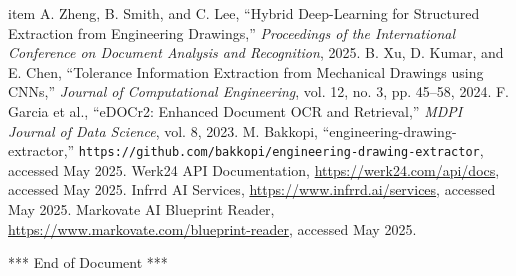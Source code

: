\documentclass[11pt,a4paper]{article}
\begin{document}
\begin{thebibliography}{9}
  \bibitem{}item A. Zheng, B. Smith, and C. Lee, “Hybrid Deep-Learning for Structured Extraction from Engineering Drawings,” \textit{Proceedings of the International Conference on Document Analysis and Recognition}, 2025.
  \bibitem B. Xu, D. Kumar, and E. Chen, “Tolerance Information Extraction from Mechanical Drawings using CNNs,” \textit{Journal of Computational Engineering}, vol. 12, no. 3, pp. 45–58, 2024.
  \bibitem F. Garcia et al., “eDOCr2: Enhanced Document OCR and Retrieval,” \textit{MDPI Journal of Data Science}, vol. 8, 2023.
  \bibitem M. Bakkopi, “engineering-drawing-extractor,” \texttt{https://github.com/bakkopi/engineering-drawing-extractor}, accessed May 2025.
  \bibitem Werk24 API Documentation, \url{https://werk24.com/api/docs}, accessed May 2025.
  \bibitem Infrrd AI Services, \url{https://www.infrrd.ai/services}, accessed May 2025.
  \bibitem Markovate AI Blueprint Reader, \url{https://www.markovate.com/blueprint-reader}, accessed May 2025.
\end{thebibliography}

\vfill
\begin{center}
*** End of Document ***
\end{center}
\end{document}
